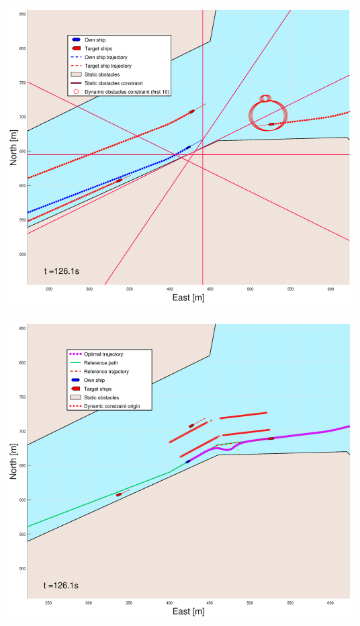 \begin{figure}[!ht]
\begin{subfigure}[b]{0.499\textwidth}
    \end{subfigure}
    \hfill
    \\
    \begin{subfigure}[b]{0.49\textwidth}
        \centering
        \includegraphics[width=\textwidth]{Images/Figures/Trheimfjord/_Simple_0fig1_time=126}
    \end{subfigure}
    \hfill
    \begin{subfigure}[b]{0.499\textwidth}
        \centering
        \includegraphics[width=\textwidth]{Images/Figures/Trheimfjord/_Simple_0fig999_time=126}

\end{subfigure}
\end{figure}
